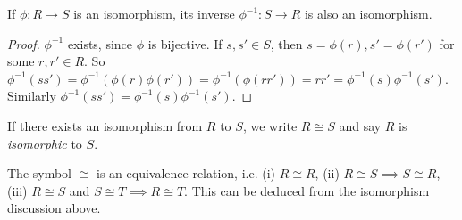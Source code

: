 \begin{Lemma}
  If $\phi : R \to S$ is an isomorphism, its inverse $\phi^{-1} : S \to R$
  is also an isomorphism.
\end{Lemma}

\begin{proof}
  $\phi^{-1}$ exists, since $\phi$ is bijective. If $s, s' \in S$, then $s =
  \phi(r), s' = \phi(r')$ for some $r, r' \in R$. So $\phi^{-1}(ss') =
  \phi^{-1}(\phi(r)\phi(r')) = \phi^{-1}(\phi(rr')) = rr' =
  \phi^{-1}(s)\phi^{-1}(s')$. Similarly $\phi^{-1}(ss') =
  \phi^{-1}(s)\phi^{-1}(s')$.
\end{proof}

\begin{Def}
  If there exists an isomorphism from $R$ to $S$, we write $R \cong S$
  and say $R$ is \emph{isomorphic} to $S$.
\end{Def}

The symbol $\cong$ is an equivalence relation, i.e. (i) $R \cong R$, (ii) $R
\cong S \implies S \cong R$, (iii) $R \cong S$ and $S \cong T \implies R \cong
T$.  This can be deduced from the isomorphism discussion above.

